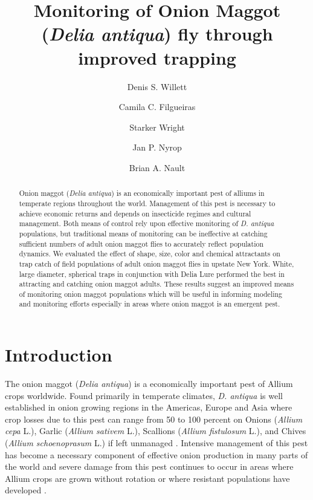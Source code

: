 \documentclass[alpha-refs]{wiley-article}
\title{Monitoring of Onion Maggot (\textit{Delia antiqua}) fly through improved trapping}
\author[1\authfn{1}]{Denis S. Willett}
\author[1\authfn{1}]{Camila C. Filgueiras}
\author[2]{Starker Wright}
\author[1]{Jan P. Nyrop}
\author[1]{Brian A. Nault}
\affil[1]{Department of Entomology, Cornell AgriTech, Cornell University, Geneva, NY, 14456, USA}
\affil[2]{Bartlett Tree Experts, Dublin, PA, USA}
\begin{document}
\maketitle

\begin{abstract}
Onion maggot (\textit{Delia antiqua}) is an economically important pest of alliums in temperate regions throughout the world.  Management of this pest is necessary to achieve economic returns and depends on insecticide regimes and cultural management.  Both means of control rely upon effective monitoring of \textit{D. antiqua} populations, but traditional means of monitoring can be ineffective at catching sufficient numbers of adult onion maggot flies to accurately reflect population dynamics.  We evaluated the effect of shape, size, color and chemical attractants on trap catch of field populations of adult onion maggot flies in upstate New York.  White, large diameter, spherical traps in conjunction with Delia Lure performed the best in attracting and catching onion maggot adults.  These results suggest an improved means of monitoring onion maggot populations which will be useful in informing modeling and monitoring efforts especially in areas where onion maggot is an emergent pest.  

\end{abstract}

\linenumbers
\section{Introduction}

The onion maggot (\textit{Delia antiqua}) is a economically important pest of Allium crops worldwide.  Found primarily in temperate climates, \textit{D. antiqua} is well established in onion growing regions in the Americas, Europe and Asia where crop losses due to this pest can range from 50 to 100 percent on Onions (\textit{Allium cepa} L.), Garlic (\textit{Allium sativem} L.), Scallions (\textit{Allium fistulosum} L.), and Chives (\textit{Allium schoenoprasum} L.) if left unmanaged \citep{ellis1979factors,ning2017predicting,nault2007ecology, nault2006performance, nault2006onion}.  Intensive management of this pest has become a necessary component of effective onion production in many parts of the world and severe damage from this pest continues to occur in areas where Allium crops are grown without rotation or where resistant populations have developed \citep{martinson1988dispersal, nault2006onion}.  
\end{document}
